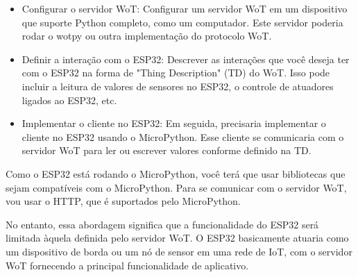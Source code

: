 \begin{itemize}
    \item  Configurar o servidor WoT: Configurar um servidor WoT em um dispositivo que suporte Python completo, como um computador. Este servidor poderia rodar o wotpy ou outra implementação do protocolo WoT.
    \item Definir a interação com o ESP32: Descrever as interações que você deseja ter com o ESP32 na forma de "Thing Description" (TD) do WoT. Isso pode incluir a leitura de valores de sensores no ESP32, o controle de atuadores ligados ao ESP32, etc.
    \item Implementar o cliente no ESP32: Em seguida, precisaria implementar o cliente no ESP32 usando o MicroPython. Esse cliente se comunicaria com o servidor WoT para ler ou escrever valores conforme definido na TD.
\end{itemize}

Como o ESP32 está rodando o MicroPython, você terá que usar bibliotecas que sejam compatíveis com o MicroPython. Para se comunicar com o servidor WoT, vou usar o HTTP, que é suportados pelo MicroPython.

No entanto, essa abordagem significa que a funcionalidade do ESP32 será limitada àquela definida pelo servidor WoT. O ESP32 basicamente atuaria como um dispositivo de borda ou um nó de sensor em uma rede de IoT, com o servidor WoT fornecendo a principal funcionalidade de aplicativo.
